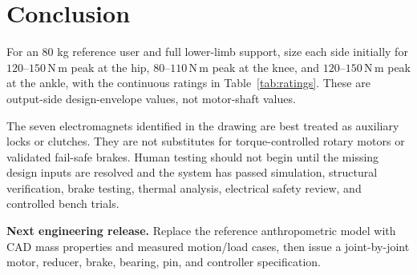 \documentclass[11pt,a4paper]{article}
\newcommand{\unit}[1]{\ensuremath{\,\mathrm{#1}}}
\newcommand{\Nm}{\unit{N\,m}}
\newcommand{\highlightbox}[2]{%
  \begingroup
  \setlength{\fboxsep}{8pt}%
  \noindent\colorbox{#1}{\parbox{\dimexpr\linewidth-2\fboxsep\relax}{#2}}%
  \endgroup
}
\begin{document}
\section{Conclusion}

For an 80 kg reference user and full lower-limb support, size each side initially for $120$--$150\Nm$ peak at the hip, $80$--$110\Nm$ peak at the knee, and $120$--$150\Nm$ peak at the ankle, with the continuous ratings in Table~\ref{tab:ratings}. These are output-side design-envelope values, not motor-shaft values.

The seven electromagnets identified in the drawing are best treated as auxiliary locks or clutches. They are not substitutes for torque-controlled rotary motors or validated fail-safe brakes. Human testing should not begin until the missing design inputs are resolved and the system has passed simulation, structural verification, brake testing, thermal analysis, electrical safety review, and controlled bench trials.

\vfill
\highlightbox{PaleBlue}{%
  \textbf{Next engineering release.} Replace the reference anthropometric model with CAD mass properties and measured motion/load cases, then issue a joint-by-joint motor, reducer, brake, bearing, pin, and controller specification.
}
\end{document}
